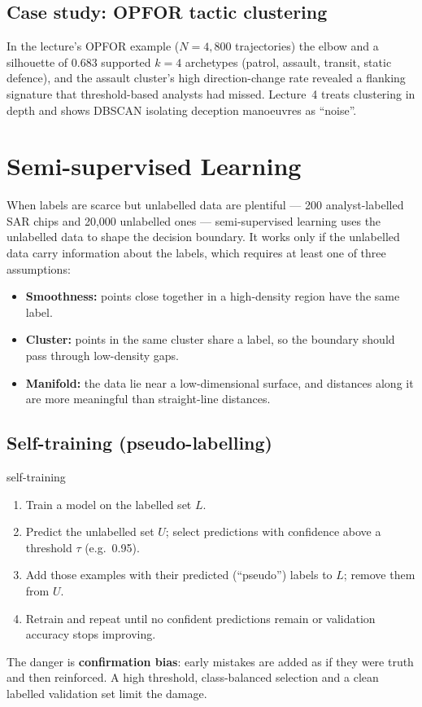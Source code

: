 \documentclass[11pt]{article}
\begin{document}
\subsection{Case study: OPFOR tactic clustering}
In the lecture's OPFOR example ($N=4{,}800$ trajectories) the elbow and a silhouette of 0.683 supported $k=4$ archetypes (patrol, assault, transit, static defence), and the assault cluster's high direction-change rate revealed a flanking signature that threshold-based analysts had missed. Lecture~4 treats clustering in depth and shows DBSCAN isolating deception manoeuvres as ``noise''.

\section{Semi-supervised Learning}
When labels are scarce but unlabelled data are plentiful --- 200 analyst-labelled SAR chips and 20,000 unlabelled ones --- semi-supervised learning uses the unlabelled data to shape the decision boundary. It works only if the unlabelled data carry information about the labels, which requires at least one of three assumptions:
\begin{itemize}
\item \textbf{Smoothness:} points close together in a high-density region have the same label.
\item \textbf{Cluster:} points in the same cluster share a label, so the boundary should pass through low-density gaps.
\item \textbf{Manifold:} the data lie near a low-dimensional surface, and distances along it are more meaningful than straight-line distances.
\end{itemize}
\subsection{Self-training (pseudo-labelling)}
\begin{algo}{self-training}
\begin{enumerate}[leftmargin=1.5em]
\item Train a model on the labelled set $L$.
\item Predict the unlabelled set $U$; select predictions with confidence above a threshold $\tau$ (e.g.\ 0.95).
\item Add those examples with their predicted (``pseudo'') labels to $L$; remove them from $U$.
\item Retrain and repeat until no confident predictions remain or validation accuracy stops improving.
\end{enumerate}
\end{algo}
The danger is \textbf{confirmation bias}: early mistakes are added as if they were truth and then reinforced. A high threshold, class-balanced selection and a clean labelled validation set limit the damage.
\end{document}
